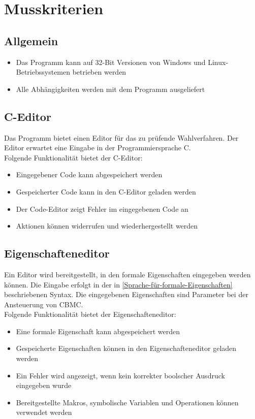 \documentclass[a4paper]{scrreprt}
\begin{document}
\section{Musskriterien}
\subsection{Allgemein}
\begin{itemize}
\item Das Programm kann auf 32-Bit Versionen von Windows und Linux-Betriebssystemen betrieben werden
\item Alle Abhängigkeiten werden mit dem Programm ausgeliefert
\end{itemize}

\subsection{C-Editor}
Das Programm bietet einen Editor für das zu prüfende Wahlverfahren. Der Editor erwartet eine Eingabe in der Programmiersprache C.\\
Folgende Funktionalität bietet der C-Editor:
\begin{itemize}
	\item Eingegebener Code kann abgespeichert werden
	\item Gespeicherter Code kann in den C-Editor geladen werden
	\item Der Code-Editor zeigt Fehler im eingegebenen Code an
	\item Aktionen können widerrufen und wiederhergestellt werden
\end{itemize}
	
\subsection{Eigenschafteneditor}
Ein Editor wird bereitgestellt, in den formale Eigenschaften eingegeben werden können. Die Eingabe erfolgt in der in \ref{Sprache-für-formale-Eigenschaften} beschriebenen Syntax. Die eingegebenen Eigenschaften sind Parameter bei der Ansteuerung von \ac{CBMC}.\\
Folgende Funktionalität bietet der Eigenschafteneditor:
\begin{itemize}
	\item Eine formale Eigenschaft kann abgespeichert werden
	\item Gespeicherte Eigenschaften können in den Eigenschafteneditor geladen werden	
	\item Ein Fehler wird angezeigt, wenn kein korrekter boolscher Ausdruck eingegeben wurde
	\item Bereitgestellte Makros, symbolische Variablen und Operationen können verwendet werden
\end{itemize}
\end{document}
